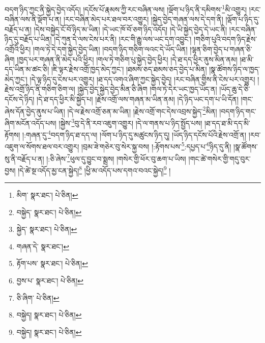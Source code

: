 བདག་ཉིད་ཀྱང་ནི་སྐྱེད་བྱེད་འདོད། །དངོས་པོ་རྣམས་ཀྱི་རང་བཞིན་ལས། །ལྡོག་པ་ཉིད་ནི་དམིགས་\footnote{མིག་  སྣར་ཐང་།  པེ་ཅིན། }མི་འགྱུར། །རང་བཞིན་ལས་ནི་ལྡོག་པ་ན། །རང་བཞིན་མེད་པར་ཐལ་བར་འགྱུར། །སྐྱེད་བྱེད་གཞན་ལས་དེ་དག་ནི། །ལྡོག་པ་ཉིད་དུ་བརྗོད་པ་ན། །དེས་བསྐྱེད་ངོ་བོ་ཉིད་མ་ཡིན། །དེ་ཡང་ཁོ་བོ་ཅག་ཉིད་འདོད། །དེ་ཡི་སྐྱེད་བྱེད་དེ་ཡང་ནི། །རང་བཞིན་ཉིད་དུ་བརྗོད་པ་ཡིན། །དེ་ཀུན་དེ་ལས་ངེས་པར་ནི། །རང་གི་རྒྱུ་ལས་ཡང་དག་འབྱུང་། །གཅིག་པུའི་བདག་ཉིད་རྗེས་འགྲོའི་ཕྱིར། །གལ་ཏེ་དེ་དག་སྐྱེད་བྱེད་ཡིན། །བདག་ཉིད་གཅིག་ལའང་དེ་ཡོད་ཡིན། །ལྷན་ཅིག་བྱེད་པ་གཞན་ཅི་ཞིག །ཁྱད་པར་གཞན་ནི་མེད་པའི་ཕྱིར། །གལ་ཏེ་གཅིག་པུ་སྐྱེད་བྱེད་ཕྱིར། །དེ་ཐ་དད་ཕྱིར་ནུས་མིན་ནམ། །ཐ་མི་དད་ཡིན་མ་ཚང་ཅི། །ཇི་ལྟར་རྗེས་འགྲོ་ཁྱད་མེད་ཀྱང་། །ཐམས་ཅད་ཐམས་ཅད་བྱེད་པ་མིན། །སྣ་ཚོགས་ཉིད་ལ་ཁྱད་མེད་ཀྱང་། །དེ་ལྟ་ཉིད་དུ་ངེས་པར་འགྱུར། །ཐ་དད་འགའ་ཞིག་ཀྱང་སྐྱེད་བྱེད། །རང་བཞིན་གྱིས་ནི་ངེས་པར་འགྱུར། །རྗེས་འགྲོ་ཉིད་ནི་གཅིག་ཅིག་ལ། །སྐྱེད་བྱེད་སྐྱེད་བྱེད་མིན་ཅི་ཞིག །གལ་ཏེ་དེར་ཡང་ཁྱད་ཡོད་ན། །ཡོད་ཆུ་དེ་ཅི་དངོས་དེ་ཉིད། །དེ་ཐ་དད་ཕྱིར་མི་སྐྱེད་པ། །རྗེས་འགྲོ་ལས་གཞན་མ་ཡིན་ནམ། །དེ་ཉིད་ཡང་དག་པ་ཡི་དོན། །གང་ཞེས་དོན་བྱེད་ནུས་པ་ཡིན། །དེ་ལ་རྗེས་འགྲོ་ཅན་མ་ཡིན། །རྗེས་འགྲོ་གང་དེས་འབྲས་སྐྱེད་\footnote{བསྐྱེད་  སྣར་ཐང་།  པེ་ཅིན། }མིན། །བདག་ཉིད་གང་ཞིག་མངོན་འདོད་པས། །སྐྱེས་\footnote{སྐྱེད་  སྣར་ཐང་།  པེ་ཅིན། }བུ་དེ་ནི་རབ་འཇུག་འགྱུར། །དེ་ལ་གནས་པ་ཉིད་སྤྱོད་པས། །ཐ་དད་ཐ་མི་དད་མི་རྟོགས། །:གཞན་དུ་\footnote{གཞན་དེ་  སྣར་ཐང་། }བདག་ཉིད་ཐ་དད་ལ། །ལོག་པ་ཉིད་དུ་མཚུངས་ཉིད་དུ། །ཡོད་ཉིད་དངོས་པོའི་རྗེས་འགྲོ་ན། །རབ་འཇུག་ལ་སོགས་ཐལ་བར་འགྱུར། །བྲམ་ཟེ་གཅེར་བུ་སེར་སྐྱ་བས། །:རྟོགས་པས་\footnote{རྟོག་པས་  སྣར་ཐང་།  པེ་ཅིན། }:དཔྱད་པ་\footnote{བྱས་པ་  སྣར་ཐང་།  པེ་ཅིན། }ཉིད་དུ་ནི། །སྣ་ཚོགས་སུ་ནི་བརྗོད་པ་ན། །:ཅི་ཞེས་\footnote{ཅི་ཞིག་  པེ་ཅིན། }ཕུལ་དུ་བྱུང་བ་སྨྲས། །གསེར་གྱི་ཕོར་བུ་ཆག་པ་ཡིས། །གང་ཚེ་གསེར་གྱི་གདུ་བུར་བྱས། །དེ་ཚེ་སྔ་འདོད་མྱ་ངན་སྐྱེད།\footnote{བསྐྱེད།  སྣར་ཐང་།  པེ་ཅིན། } །ཕྱི་མ་འདོད་པས་དགའ་བའང་སྐྱེད།\footnote{བསྐྱེད།  སྣར་ཐང་།  པེ་ཅིན། } །

